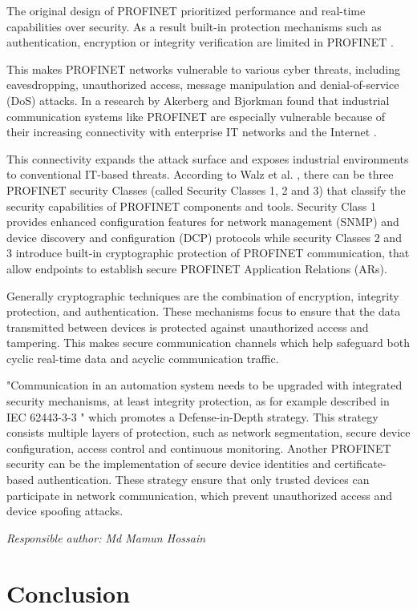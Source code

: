 \documentclass[conference]{IEEEtran}
\begin{document}
The original design of PROFINET prioritized performance and real-time capabilities over security. As a result built-in protection mechanisms such as authentication, encryption or integrity verification are limited in PROFINET \cite{b16}.

This makes PROFINET networks vulnerable to various cyber threats, including eavesdropping, unauthorized access, message manipulation and denial-of-service (DoS) attacks. In a research by Akerberg and Bjorkman found that industrial communication systems like PROFINET are especially vulnerable because of their increasing connectivity with enterprise IT networks and the Internet \cite{b16}. 

This connectivity expands the attack surface and exposes industrial environments to conventional IT-based threats. According to Walz et al. , there can be three PROFINET security Classes  (called Security Classes 1, 2 and 3) that classify the security capabilities of PROFINET components and tools\cite{b16}. Security Class 1 provides enhanced configuration features for network management (SNMP) and device discovery and configuration (DCP) protocols while security Classes 2 and 3 introduce built-in cryptographic protection of PROFINET communication, that allow endpoints to establish secure PROFINET Application Relations (ARs)\cite{b17}.

Generally cryptographic techniques are the combination of  encryption, integrity protection, and authentication. These mechanisms focus to ensure that the data transmitted between devices is protected against unauthorized access and tampering. This  makes secure communication channels which help safeguard both cyclic real-time data and acyclic communication traffic\cite{b17}. 

"Communication in an automation system needs to be upgraded with integrated security mechanisms, at least integrity protection, as for example described in IEC 62443-3-3 " which promotes a Defense-in-Depth strategy. This strategy consists multiple layers of protection, such as network segmentation, secure device configuration, access control and continuous monitoring. Another PROFINET security can be  the implementation of secure device identities and certificate-based authentication. These strategy ensure that only trusted devices can participate in network communication, which prevent unauthorized access and device spoofing attacks\cite{b17}. 

\textit{Responsible author: Md Mamun Hossain}
\section{ Conclusion }
\end{document}
